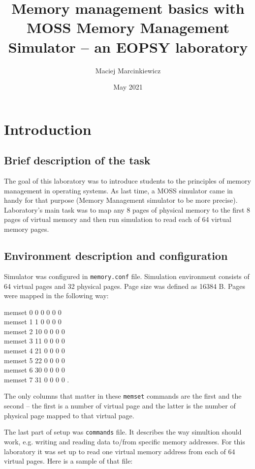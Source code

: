 \documentclass{article}
\title{Memory management basics with MOSS Memory Management Simulator -- an EOPSY laboratory}
\author{Maciej Marcinkiewicz}
\date{\nth{18} May 2021}
\begin{document}
\maketitle

\section{Introduction}
\subsection{Brief description of the task}
The goal of this laboratory was to introduce students to the principles of memory management
in operating systems. As last time, a MOSS simulator came in handy for that purpose (Memory Management simulator to be more precise).
Laboratory's main task was to map any 8 pages of physical memory to the first 8 pages of virtual memory and then run simulation
to read each of 64 virtual memory pages.

\subsection{Environment description and configuration}
Simulator was configured in \texttt{memory.conf} file. Simulation environment consists of 64 virtual pages and 32 physical pages. Page size was defined as 16384 B.
Pages were mapped in the following way:

\noindent
\ttfamily
memset 0 0 0 0 0 0\\
memset 1 1 0 0 0 0      \\
memset 2 10 0 0 0 0      \\
memset 3 11 0 0 0 0      \\
memset 4 21 0 0 0 0      \\
memset 5 22 0 0 0 0      \\
memset 6 30 0 0 0 0      \\
memset 7 31 0 0 0 0
\rmfamily
.

The only columns that matter in these \texttt{memset} commands are the first and the second --
the first is a number of virtual page and the latter is the number of physical page mapped to
that virtual page.

The last part of setup was \texttt{commands} file. It describes the way simultion should work,
e.g. writing and reading data to/from specific memory addresses. For this laboratory it was set up
to read one virtual memory address from each of 64 virtual pages. Here is a sample of that file:
\end{document}
